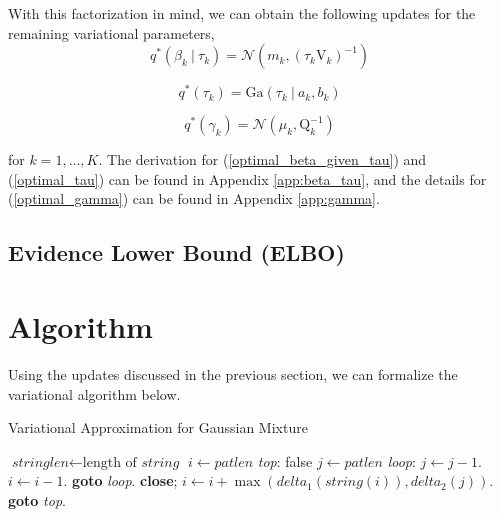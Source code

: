 \documentclass[twoside,11pt]{article}
\newcommand\given[1][]{\:#1\vert\:}
\begin{document}
With this factorization in mind, we can obtain the following updates for the remaining variational parameters,
\begin{equation} \label{optimal_beta_given_tau}
	q^{*}(\beta_k \given \tau_k) = \mathcal{N}\left(m_k, (\tau_k \mathrm{V}_k)^{-1} \right)
\end{equation}

\begin{equation} \label{optimal_tau}
	q^{*}(\tau_k) =  \mathrm{Ga}\left( \tau_k \given a_k, b_k \right)
\end{equation}

\begin{equation} \label{optimal_gamma}
	q^{*}(\gamma_k) = \mathcal{N} \left( \mu_k, \mathrm{Q}_k^{-1} \right)
\end{equation}

for $k = 1, \ldots, K$. The derivation for (\ref{optimal_beta_given_tau}) and (\ref{optimal_tau}) can be found in Appendix \ref{app:beta_tau}, and the details for (\ref{optimal_gamma}) can be found in Appendix \ref{app:gamma}.



\subsection{Evidence Lower Bound (ELBO)}



\section{Algorithm}

Using the updates discussed in the previous section, we can formalize the variational algorithm below.

\begin{algorithm}
\caption{Variational Approximation for Gaussian Mixture}\label{alg:vb}
\begin{algorithmic}[1]
\State $\textit{stringlen} \gets \text{length of }\textit{string}$
\State $i \gets \textit{patlen}$
\BState \emph{top}:
 \Return false
\EndIf
\State $j \gets \textit{patlen}$
\BState \emph{loop}:
\State $j \gets j-1$.
\State $i \gets i-1$.
\State \textbf{goto} \emph{loop}.
\State \textbf{close};
\EndIf
\State $i \gets i+\max(\textit{delta}_1(\textit{string}(i)),\textit{delta}_2(j))$.
\State \textbf{goto} \emph{top}.
\EndProcedure
\end{algorithmic}
\end{algorithm}
\end{document}
